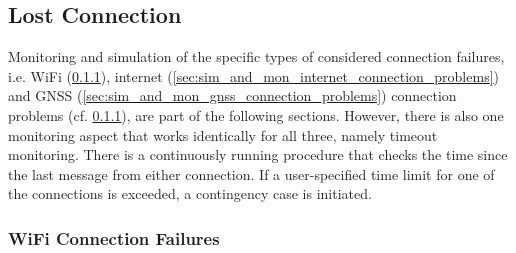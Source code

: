 \documentclass[english, master, utf8]{base/thesis_KBS}
\begin{document}
\subsection{Lost Connection}
\label{sec:sim_and_mon_lost_connections}

Monitoring and simulation of the specific types of considered connection failures, i.e. WiFi (\ref{sec:sim_and_mon_wifi_connection_problems}), internet
(\ref{sec:sim_and_mon_internet_connection_problems}) and GNSS (\ref{sec:sim_and_mon_gnss_connection_problems}) connection problems (cf. \ref{sec:sim_and_mon_wifi_connection_problems}),
are part of the following sections. However, there is also one monitoring aspect that works identically for all three, namely timeout monitoring. There is a continuously running
procedure that checks the time since the last message from either connection. If a user-specified time limit for one of the connections is exceeded, a contingency case is initiated.

\subsubsection{WiFi Connection Failures}
\label{sec:sim_and_mon_wifi_connection_problems}
\end{document}
